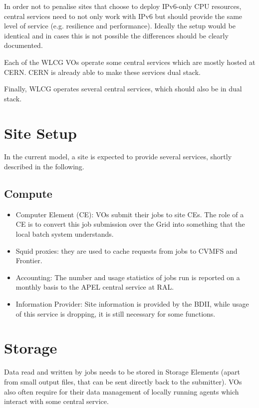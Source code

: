 In order not to penalise sites that choose to deploy IPv6-only CPU
resources, central services need to not only work with IPv6 but should
provide the same level of service (e.g. resilience and performance).
Ideally the setup would be identical and in cases this is not possible
the differences should be clearly documented.

Each of the WLCG VOs operate some central services which are mostly
hosted at CERN. CERN is already able to make these services dual
stack.

Finally, WLCG operates several central services, which should also be
in dual stack.

\section{Site Setup}
In the current model, a site is expected to provide several services, shortly described in the following.

\subsection{Compute}
\begin{itemize}
\item Computer Element (CE): VOs submit their jobs to site CEs.  The
  role of a CE is to convert this job submission over the Grid into
  something that the local batch system understands.
\item Squid proxies: they are used to cache requests from jobs to
  CVMFS and Frontier.
\item Accounting: The number and usage statistics of jobs run is
  reported on a monthly basis to the APEL central service at RAL.
\item Information Provider: Site information is provided by the BDII, while usage of this service is dropping, it is still necessary for some functions.
\end{itemize}

\section{Storage}
Data read and written by jobs needs to be stored in Storage Elements
(apart from small output files, that can be sent directly back to the
submitter). VOs also often require for their data management of
locally running agents which interact with some central service.


